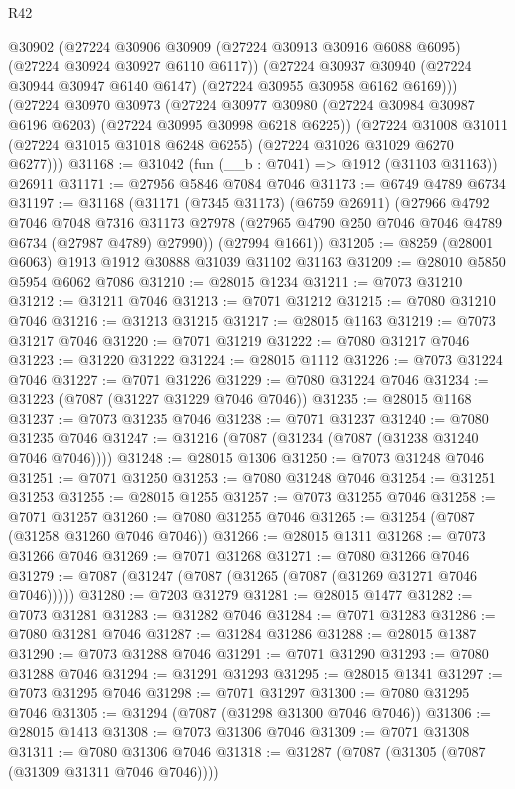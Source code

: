 \begin{lexlean}{R42}
\begin{coremodule}
{      @30902
      (@27224 @30906 @30909 (@27224 @30913 @30916 @6088 @6095) (@27224 @30924 @30927 @6110 @6117))
      (@27224 @30937 @30940 (@27224 @30944 @30947 @6140 @6147) (@27224 @30955 @30958 @6162 @6169)))
    (@27224
      @30970
      @30973
      (@27224 @30977 @30980 (@27224 @30984 @30987 @6196 @6203) (@27224 @30995 @30998 @6218 @6225))
      (@27224 @31008 @31011 (@27224 @31015 @31018 @6248 @6255) (@27224 @31026 @31029 @6270 @6277)))
@31168 := @31042 (fun (__b : @7041) => @1912 (@31103 @31163)) @26911
@31171 := @27956 @5846 @7084 @7046
@31173 := @6749 @4789 @6734
@31197 := @31168
    (@31171
      (@7345 @31173)
      (@6759 @26911)
      (@27966
        @4792
        @7046
        @7048
        @7316
        @31173
        @27978
        (@27965 @4790 @250 @7046 @7046 @4789 @6734 (@27987 @4789) @27990))
      (@27994 @1661))
@31205 := @8259 (@28001 @6063) @1913 @1912 @30888 @31039 @31102 @31163
@31209 := @28010 @5850 @5954 @6062 @7086
@31210 := @28015 @1234
@31211 := @7073 @31210
@31212 := @31211 @7046
@31213 := @7071 @31212
@31215 := @7080 @31210 @7046
@31216 := @31213 @31215
@31217 := @28015 @1163
@31219 := @7073 @31217 @7046
@31220 := @7071 @31219
@31222 := @7080 @31217 @7046
@31223 := @31220 @31222
@31224 := @28015 @1112
@31226 := @7073 @31224 @7046
@31227 := @7071 @31226
@31229 := @7080 @31224 @7046
@31234 := @31223 (@7087 (@31227 @31229 @7046 @7046))
@31235 := @28015 @1168
@31237 := @7073 @31235 @7046
@31238 := @7071 @31237
@31240 := @7080 @31235 @7046
@31247 := @31216 (@7087 (@31234 (@7087 (@31238 @31240 @7046 @7046))))
@31248 := @28015 @1306
@31250 := @7073 @31248 @7046
@31251 := @7071 @31250
@31253 := @7080 @31248 @7046
@31254 := @31251 @31253
@31255 := @28015 @1255
@31257 := @7073 @31255 @7046
@31258 := @7071 @31257
@31260 := @7080 @31255 @7046
@31265 := @31254 (@7087 (@31258 @31260 @7046 @7046))
@31266 := @28015 @1311
@31268 := @7073 @31266 @7046
@31269 := @7071 @31268
@31271 := @7080 @31266 @7046
@31279 := @7087 (@31247 (@7087 (@31265 (@7087 (@31269 @31271 @7046 @7046)))))
@31280 := @7203 @31279
@31281 := @28015 @1477
@31282 := @7073 @31281
@31283 := @31282 @7046
@31284 := @7071 @31283
@31286 := @7080 @31281 @7046
@31287 := @31284 @31286
@31288 := @28015 @1387
@31290 := @7073 @31288 @7046
@31291 := @7071 @31290
@31293 := @7080 @31288 @7046
@31294 := @31291 @31293
@31295 := @28015 @1341
@31297 := @7073 @31295 @7046
@31298 := @7071 @31297
@31300 := @7080 @31295 @7046
@31305 := @31294 (@7087 (@31298 @31300 @7046 @7046))
@31306 := @28015 @1413
@31308 := @7073 @31306 @7046
@31309 := @7071 @31308
@31311 := @7080 @31306 @7046
@31318 := @31287 (@7087 (@31305 (@7087 (@31309 @31311 @7046 @7046))))
}
\end{coremodule}
\end{lexlean}
